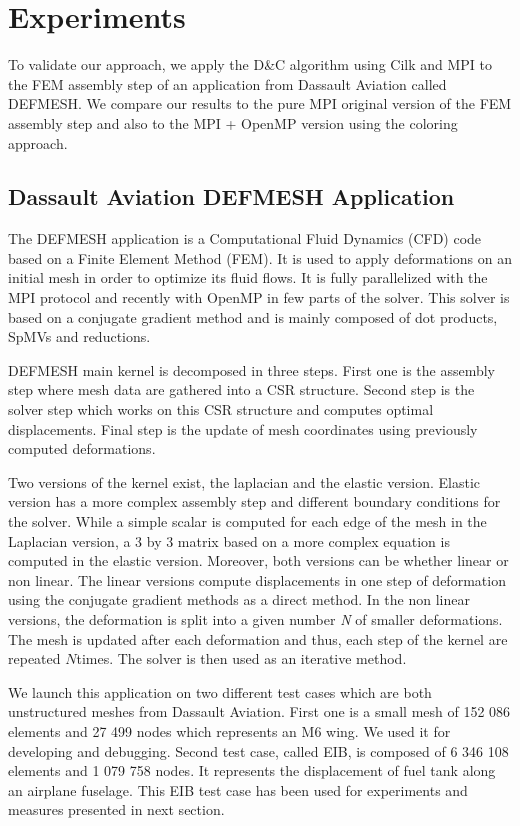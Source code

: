 \documentclass{IOS-Book-Article}
\begin{document}
\section{Experiments}
To validate our approach, we apply the D\&C algorithm using Cilk and MPI to the FEM assembly step of an application from Dassault Aviation called DEFMESH.
We compare our results to the pure MPI original version of the FEM assembly step and also to the MPI + OpenMP version using the coloring approach.

\subsection{Dassault Aviation DEFMESH Application}
The DEFMESH application is a Computational Fluid Dynamics (CFD) code based on a Finite Element Method (FEM).
It is used to apply deformations on an initial mesh in order to optimize its fluid flows.
It is fully parallelized with the MPI protocol and recently with OpenMP in few parts of the solver.
This solver is based on a conjugate gradient method and is mainly composed of dot products, SpMVs and reductions.

DEFMESH main kernel is decomposed in three steps.
First one is the assembly step where mesh data are gathered into a CSR structure.
Second step is the solver step which works on this CSR structure and computes optimal displacements.
Final step is the update of mesh coordinates using previously computed deformations.

Two versions of the kernel exist, the laplacian and the elastic version. Elastic version has a more complex assembly step and different boundary conditions for the solver.
While a simple scalar is computed for each edge of the mesh in the Laplacian version, a 3 by 3 matrix based on a more complex equation is computed in the elastic version.
Moreover, both versions can be whether linear or non linear.
The linear versions compute displacements in one step of deformation using the conjugate gradient methods as a direct method.
In the non linear versions, the deformation is split into a given number \emph{N} of smaller deformations.
The mesh is updated after each deformation and thus, each step of the kernel are repeated $N$times. The solver is then used as an iterative method.

We launch this application on two different test cases which are both unstructured meshes from Dassault Aviation.
First one is a small mesh of 152 086 elements and 27 499 nodes which represents an M6 wing. We used it for developing and debugging.
Second test case, called EIB, is composed of 6 346 108 elements and 1 079 758 nodes. It represents the displacement of fuel tank along an airplane fuselage.
This EIB test case has been used for experiments and measures presented in next section.
\end{document}
